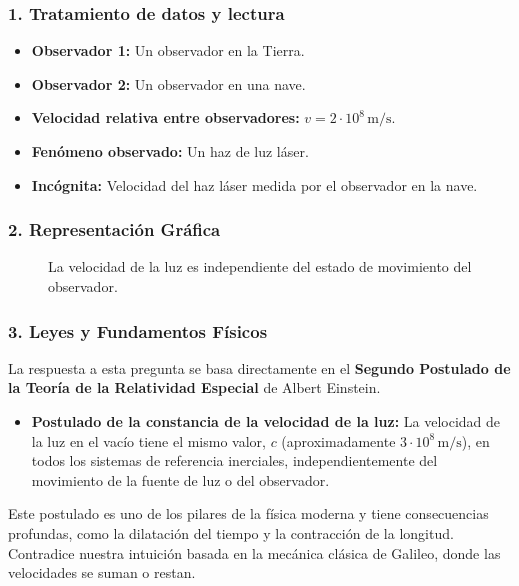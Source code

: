 \subsubsection*{1. Tratamiento de datos y lectura}
\begin{itemize}
    \item \textbf{Observador 1:} Un observador en la Tierra.
    \item \textbf{Observador 2:} Un observador en una nave.
    \item \textbf{Velocidad relativa entre observadores:} $v = 2 \cdot 10^8\,\text{m/s}$.
    \item \textbf{Fenómeno observado:} Un haz de luz láser.
    \item \textbf{Incógnita:} Velocidad del haz láser medida por el observador en la nave.
\end{itemize}

\subsubsection*{2. Representación Gráfica}
\begin{figure}[H]
    \centering
    \caption{La velocidad de la luz es independiente del estado de movimiento del observador.}
\end{figure}

\subsubsection*{3. Leyes y Fundamentos Físicos}
La respuesta a esta pregunta se basa directamente en el \textbf{Segundo Postulado de la Teoría de la Relatividad Especial} de Albert Einstein.
\begin{itemize}
    \item \textbf{Postulado de la constancia de la velocidad de la luz:} La velocidad de la luz en el vacío tiene el mismo valor, $c$ (aproximadamente $3 \cdot 10^8\,\text{m/s}$), en todos los sistemas de referencia inerciales, independientemente del movimiento de la fuente de luz o del observador.
\end{itemize}
Este postulado es uno de los pilares de la física moderna y tiene consecuencias profundas, como la dilatación del tiempo y la contracción de la longitud. Contradice nuestra intuición basada en la mecánica clásica de Galileo, donde las velocidades se suman o restan.

